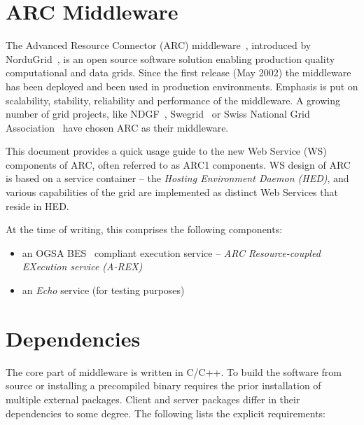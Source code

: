 \documentclass{article}                            %
\begin{document}
\tableofcontents                          %
\newpage


\section{ARC Middleware}                    %
\label{sec:arc-intro}

The Advanced Resource Connector (ARC) middleware~\cite{arc}, introduced by
NorduGrid~\cite{nordugrid}, is an open source software solution
enabling production quality computational and data grids.
Since the first release (May 2002) the middleware has been deployed and
been used in production environments. Emphasis is put on scalability,
stability, reliability and performance of the middleware. A growing
number of grid projects, like NDGF~\cite{ndgf}, Swegrid~\cite{swegrid} or Swiss
National Grid Association~\cite{swing} have chosen ARC as their middleware.

This document provides a quick usage guide to the new Web Service (WS)
components of ARC, often referred to as ARC1 components. WS design of ARC is
based on a service container -- the \textit{Hosting Environment Daemon (HED)},
and various capabilities of the grid are implemented as distinct Web Services
that reside in HED.

At the time of writing, this comprises the following components:
\begin{itemize}
\item an OGSA BES~\cite{ogsa-bes} compliant execution service --
\textit{ARC Resource-coupled EXecution service (A-REX)}~\cite{arex}
\item an \textit{Echo} service (for testing purposes)
\end{itemize}

\section{Dependencies}
\label{sec:deps}

The core part of middleware is written in C/C++. To build the software
from source or installing a precompiled binary requires the prior installation
of multiple external packages. Client and server packages differ in their
dependencies to some degree. The following lists the explicit requirements:
\end{document}
